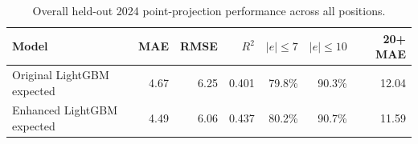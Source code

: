 \begin{table}[!htbp]
\caption{Overall held-out 2024 point-projection performance across all positions.}
\label{tab:regression-overall}
\centering
\footnotesize
\begin{tabular}{lrrrrrr}
\toprule
Model & MAE & RMSE & $R^2$ & $|e|\leq7$ & $|e|\leq10$ & 20+ MAE \\
\midrule
Original LightGBM expected & 4.67 & 6.25 & 0.401 & 79.8\% & 90.3\% & 12.04 \\
Enhanced LightGBM expected & 4.49 & 6.06 & 0.437 & 80.2\% & 90.7\% & 11.59 \\
\bottomrule
\end{tabular}
\end{table}
